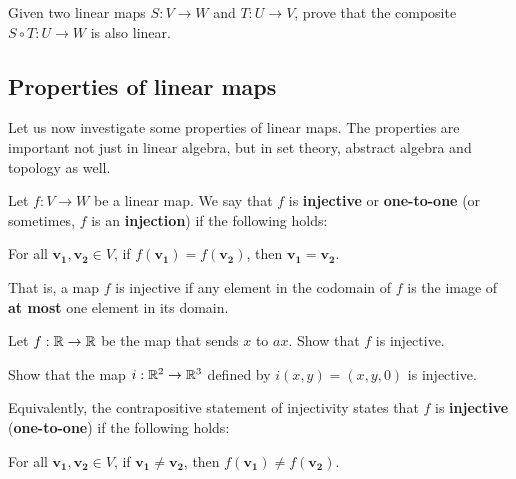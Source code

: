 \begin{proposition}\label{propcomposite}
    Given two linear maps $S: V \to W$ and $T : U \to V$, prove that the composite $S \circ T : U \to W$ is also linear.
\end{proposition}

\subsection{Properties of linear maps}

Let us now investigate some properties of linear maps.  The properties are important not just in linear algebra, but in set theory, abstract algebra and topology as well.

\begin{definition}
    Let $f: V \to W$ be a linear map.  We say that $f$ is \textbf{injective} or \textbf{one-to-one} (or sometimes, $f$ is an \textbf{injection}) if the following holds:
    
    \begin{center}
        
    For all $\bm{v_1}, \bm{v_2} \in V$, if $f(\bm{v_1}) = f(\bm{v_2})$, then $\bm{v_1} = \bm{v_2}$.
    \end{center}
    
\end{definition}

    That is, a map $f$ is injective if any element in the codomain of $f$ is the image of \textbf{at most} one element in its domain.  

\begin{example}
    Let $f: \mathbb{R} \to \mathbb{R}$ be the map that sends $x$ to $ax$. Show that $f$ is injective.
\end{example}


\begin{example}
Show that the map $i: \mathbb{R}^2 \to \mathbb{R}^3$ defined by $i(x,y) = (x,y,0)$ is injective.
\end{example}

\begin{example}
    Equivalently, the contrapositive statement of injectivity states that $f$ is \textbf{injective} (\textbf{one-to-one}) if the following holds:
    
    \begin{center}
    For all $\bm{v_1}, \bm{v_2} \in V$, if $\bm{v_1} \neq \bm{v_2}$, then $f(\bm{v_1}) \neq f(\bm{v_2})$.
        
    \end{center}
    
\end{example}

